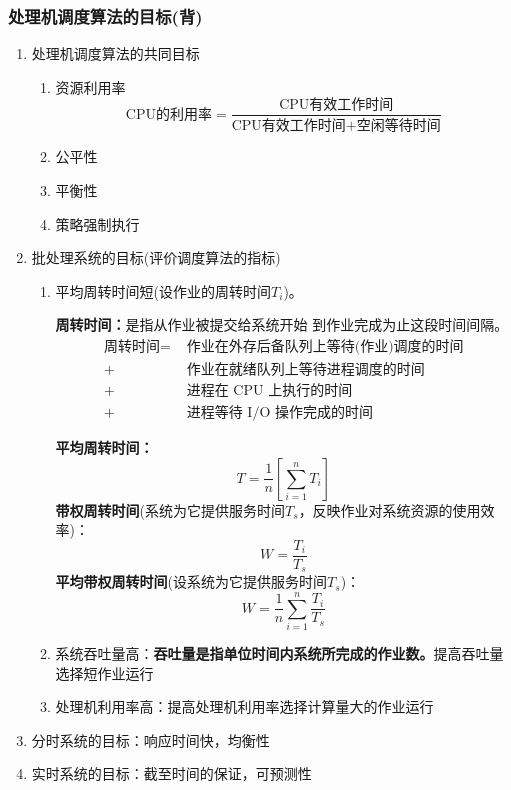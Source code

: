 \documentclass{article}
\begin{document}
\subsubsection{{\color{red}处理机调度算法的目标}{\color{green}(背)}}
\begin{enumerate}
    \item 处理机调度算法的共同目标
    \begin{enumerate}
        \item 资源利用率
        \[\text{CPU的利用率}=\frac{\text{CPU有效工作时间}}{\text{CPU有效工作时间}+\text{空闲等待时间}}\]
        \item 公平性
        \item 平衡性
        \item 策略强制执行
    \end{enumerate}
    \item 批处理系统的目标(评价调度算法的指标)
    \begin{enumerate}
        \item 平均周转时间短(设作业的周转时间$T_i$)。

        \textbf{周转时间：}是指从作业被提交给系统开始
        到作业完成为止这段时间间隔。
        \vspace*{-0.2cm}
        \begin{equation}
            \begin{split}
                \text{周转时间} =& \text{ 作业在外存后备队列上等待(作业)调度的时间}\\
                    + &\text{ 作业在就绪队列上等待进程调度的时间}\\
                    + &\text{ 进程在 CPU 上执行的时间}\\
                    + &\text{ 进程等待 I/O 操作完成的时间}\nonumber
            \end{split}
            \end{equation}


        \textbf{平均周转时间：}
        \[T=\frac{1}{n}[\sum_{i=1}^nT_i]\]
        \textbf{带权周转时间}(系统为它提供服务时间$T_s$，反映作业对系统资源的使用效率)：
        \[W=\frac{T_i}{T_s}\]
        \textbf{平均带权周转时间}(设系统为它提供服务时间$T_s$)：
        \[W=\frac{1}{n}\sum_{i=1}^{n}\frac{T_i}{T_s}\]
        \item 系统吞吐量高：\textbf{吞吐量是指单位时间内系统所完成的作业数。}提高吞吐量选择短作业运行
        \item 处理机利用率高：提高处理机利用率选择计算量大的作业运行
    \end{enumerate}
    \item 分时系统的目标：响应时间快，均衡性
    \item 实时系统的目标：截至时间的保证，可预测性
\end{enumerate}
\end{document}
